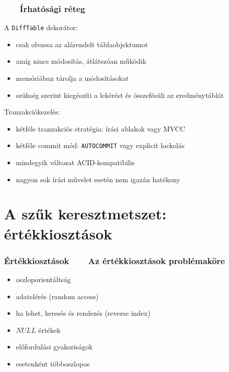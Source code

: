 \documentclass[
]{beamer}
\newcommand{\slidetitle}[2]{\frametitle{{\small #1 ~ \ding{226} ~ } \normalsize \textbf{#2} }}
\begin{document}
\begin{frame}
    \slidetitle{\sectionshorttitle}{Írhatósági réteg}
    
    A \texttt{DiffTable} dekorátor:
    
    \begin{itemize}
        \item csak olvassa az alárendelt táblaobjektumot
        \item amíg nincs módosítás, átlátszóan működik
        \item memóriában tárolja a módosításokat
        \item szükség szerint kiegészíti a lekérést és összefésüli az eredménytáblát
    \end{itemize}
    
    \vspace{0.4cm}
    
    \pause Tranzakciókezelés:
    
    \begin{itemize}
        \item kétféle tranzakciós stratégia: írási ablakok vagy MVCC
        \item kétféle commit mód: \texttt{AUTOCOMMIT} vagy explicit lockolás
        \item mindegyik változat ACID-kompatibilis
        \item nagyon sok írási művelet esetén nem igazán hatékony
    \end{itemize}
\end{frame}

\section{A szűk keresztmetszet: értékkiosztások}
\def\sectionshorttitle{Értékkiosztások}

\begin{frame}
    \slidetitle{\sectionshorttitle}{Az értékkiosztások problémaköre}
    
    
    \begin{itemize}
        \setlength\itemsep{1em}
        \item oszloporientáltság
        \item adatelérés (random access)
        \item ha lehet, keresés és rendezés (reverse index)
        \item $NULL$ értékek
        \item előfordulási gyakoriságok
        \item esetenként többoszlopos
    \end{itemize}
\end{frame}
\end{document}

